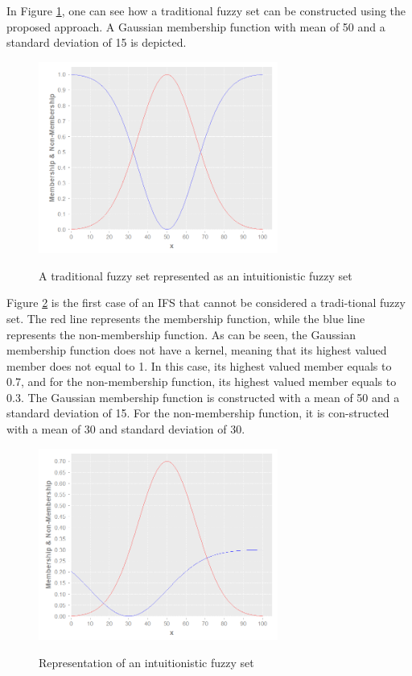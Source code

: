 In Figure \ref{figure:traditional-set-as-ifs}, one can see how a traditional
fuzzy set can be constructed using the proposed approach. A Gaussian membership
function with mean of 50 and a standard deviation of 15 is depicted.

\begin{figure}
\caption{A traditional fuzzy set represented as an intuitionistic fuzzy set}
\centering \includegraphics[width=0.7\textwidth]{img/traditional-set-as-ifs.png}
\label{figure:traditional-set-as-ifs}
\end{figure}

Figure \ref{figure:example-of-ifs} is the first case of an IFS that cannot be
considered a tradi-tional fuzzy set. The red line represents the membership
function, while the blue line represents the non-membership function. As can be
seen, the Gaussian membership function does not have a kernel, meaning that its
highest valued member does not equal to 1. In this case, its highest valued
member equals to 0.7, and for the non-membership function, its highest valued
member equals to 0.3. The Gaussian membership function is constructed with a
mean of 50 and a standard deviation of 15. For the non-membership function, it
is con-structed with a mean of 30 and standard deviation of 30.

\begin{figure}
\caption{Representation of an intuitionistic fuzzy set} \centering
\includegraphics[width=0.7\textwidth]{img/example-of-ifs.png}
\label{figure:example-of-ifs}
\end{figure}
